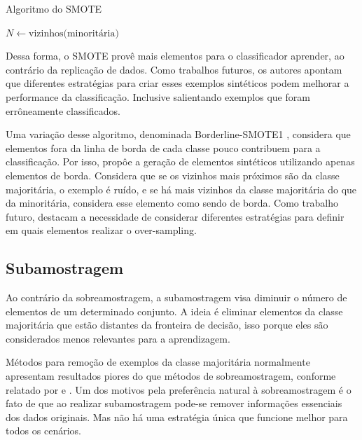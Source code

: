 \begin{algorithm}[H]
  \caption{Algoritmo do SMOTE}
  \label{alg:smote}
  \SetAlgoLined
  $N \gets \text{vizinhos(minoritária)}$\;
\end{algorithm}


Dessa forma, o SMOTE provê mais elementos para o classificador aprender, ao contrário da replicação de dados. Como trabalhos futuros, os autores  apontam que diferentes estratégias para criar esses exemplos sintéticos podem melhorar a performance da classificação. Inclusive salientando exemplos que foram errôneamente classificados.

Uma variação desse algoritmo, denominada Borderline-SMOTE1 \cite{Han2005}, considera que elementos fora da linha de borda de cada classe pouco contribuem para a classificação. Por isso, propôe a geração de elementos sintéticos utilizando apenas elementos de borda. Considera que se os vizinhos mais próximos são da classe majoritária, o exemplo é ruído, e se há mais vizinhos da classe majoritária do que da minoritária, considera esse elemento como sendo de borda. Como trabalho futuro, destacam a necessidade de considerar diferentes estratégias para definir em quais elementos realizar o over-sampling.


\subsection{Subamostragem}

Ao contrário da sobreamostragem, a subamostragem visa diminuir o número de elementos de um determinado conjunto. A ideia é eliminar elementos da classe majoritária que estão distantes da fronteira de decisão, isso porque eles são considerados menos relevantes para a aprendizagem.

Métodos para remoção de exemplos da classe majoritária normalmente apresentam resultados piores do que métodos de sobreamostragem, conforme relatado por  e \cite{Japkowicz2002}. Um dos motivos pela preferência natural à sobreamostragem é o fato de que ao realizar subamostragem pode-se remover informações essenciais dos dados originais. Mas não há uma estratégia única que funcione melhor para todos os cenários.

